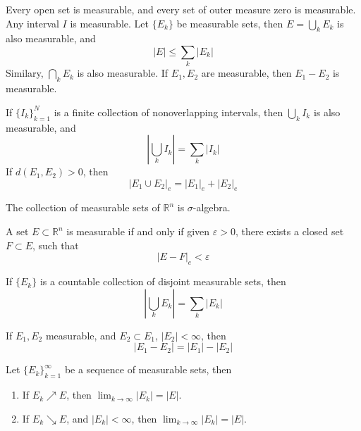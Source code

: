 \documentclass[openany]{book}
\newcommand{\R}{\mathbb{R}}
\begin{document}
\begin{prop}
    Every open set is measurable, and every set of outer measure zero is measurable. Any interval $I$ is measurable. Let $\{E_k\}$ be measurable sets, then $E=\bigcup_kE_k$ is also measurable, and 
    \begin{equation*}
        |E|\leq\sum_k|E_k|
    \end{equation*}
    Similary, $\bigcap_kE_k$ is also measurable. If $E_1,E_2$ are measurable, then $E_1-E_2$ is measurable.
\end{prop}
\begin{prop}
    If $\{I_k\}_{k=1}^N$ is a finite collection of nonoverlapping intervals, then $\bigcup_kI_k$ is also measurable, and 
    \begin{equation*}
        \left|\bigcup_kI_k\right|=\sum_k|I_k|
    \end{equation*}
    If $d(E_1,E_2)>0$, then 
    \begin{equation*}
        |E_1\cup E_2|_e=|E_1|_e+|E_2|_e
    \end{equation*}
\end{prop}
\begin{prop}
    The collection of measurable sets of $\R^n$ is $\sigma$-algebra.
\end{prop}
\begin{prop}
    A set $E\subset\R^n$ is measurable if and only if given $\varepsilon>0$, there exists a closed set $F\subset E$, such that 
    \begin{equation*}
        |E-F|_e<\varepsilon
    \end{equation*}
\end{prop}
\begin{thm}
    If $\{E_k\}$ is a countable collection of disjoint measurable sets, then 
    \begin{equation*}
        \left|\bigcup_kE_k\right|=\sum_k|E_k|
    \end{equation*}
\end{thm}
\begin{prop}
    If $E_1,E_2$ measurable, and $E_2\subset E_1$, $|E_2|<\infty$, then 
    \begin{equation*}
        |E_1-E_2|=|E_1|-|E_2|
    \end{equation*}
\end{prop}
\begin{thm}
    Let $\{E_k\}_{k=1}^\infty$ be a sequence of measurable sets, then 
    \begin{enumerate}
        \item If $E_k\nearrow E$, then $\lim_{k\to\infty}|E_k|=|E|$.
        \item If $E_k\searrow E$, and $|E_k|<\infty$, then $\lim_{k\to\infty}|E_k|=|E|$.
    \end{enumerate}
\end{thm}
\end{document}
